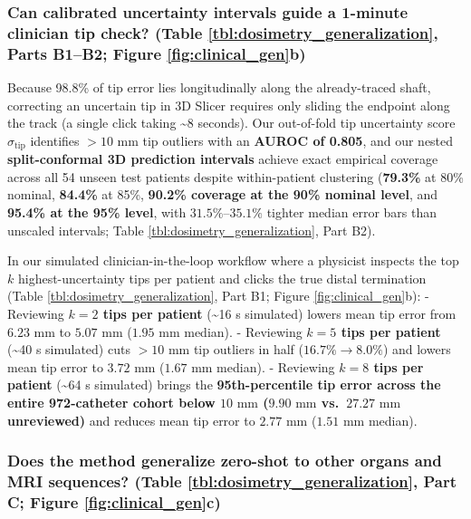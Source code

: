 \documentclass[
  11pt,
]{article}
\begin{document}
\subsubsection{\texorpdfstring{Can calibrated uncertainty intervals
guide a 1-minute clinician tip check? (Table
\ref{tbl:dosimetry_generalization}, Parts B1--B2; Figure
\ref{fig:clinical_gen}b)}{Can calibrated uncertainty intervals guide a 1-minute clinician tip check? (Table , Parts B1--B2; Figure b)}}\label{can-calibrated-uncertainty-intervals-guide-a-1-minute-clinician-tip-check-table-parts-b1b2-figure-b}

Because 98.8\% of tip error lies longitudinally along the already-traced
shaft, correcting an uncertain tip in 3D Slicer requires only sliding
the endpoint along the track (a single click taking \textasciitilde8
seconds). Our out-of-fold tip uncertainty score
\(\hat{\sigma}_{\text{tip}}\) identifies \(>10\text{ mm}\) tip outliers
with an \textbf{AUROC of 0.805}, and our nested \textbf{split-conformal
3D prediction intervals} achieve exact empirical coverage across all 54
unseen test patients despite within-patient clustering (\textbf{79.3\%}
at 80\% nominal, \textbf{84.4\%} at 85\%, \textbf{90.2\% coverage at the
90\% nominal level}, and \textbf{95.4\% at the 95\% level}, with
\(31.5\%\text{--}35.1\%\) tighter median error bars than unscaled
intervals; Table \ref{tbl:dosimetry_generalization}, Part B2).

In our simulated clinician-in-the-loop workflow where a physicist
inspects the top \(k\) highest-uncertainty tips per patient and clicks
the true distal termination (Table \ref{tbl:dosimetry_generalization},
Part B1; Figure \ref{fig:clinical_gen}b): - Reviewing \textbf{\(k = 2\)
tips per patient} (\textasciitilde16 s simulated) lowers mean tip error
from \(6.23\text{ mm}\) to \textbf{\(5.07\text{ mm}\)}
(\(1.95\text{ mm}\) median). - Reviewing \textbf{\(k = 5\) tips per
patient} (\textasciitilde40 s simulated) cuts \(>10\text{ mm}\) tip
outliers in half (\(16.7\% \to 8.0\%\)) and lowers mean tip error to
\textbf{\(3.72\text{ mm}\)} (\(1.67\text{ mm}\) median). - Reviewing
\textbf{\(k = 8\) tips per patient} (\textasciitilde64 s simulated)
brings the \textbf{95th-percentile tip error across the entire
972-catheter cohort below \(10\text{ mm}\) (\(9.90\text{ mm}\)
vs.~\(27.27\text{ mm}\) unreviewed)} and reduces mean tip error to
\textbf{\(2.77\text{ mm}\)} (\(1.51\text{ mm}\) median).

\subsubsection{\texorpdfstring{Does the method generalize zero-shot to
other organs and MRI sequences? (Table
\ref{tbl:dosimetry_generalization}, Part C; Figure
\ref{fig:clinical_gen}c)}{Does the method generalize zero-shot to other organs and MRI sequences? (Table , Part C; Figure c)}}\label{does-the-method-generalize-zero-shot-to-other-organs-and-mri-sequences-table-part-c-figure-c}
\end{document}
